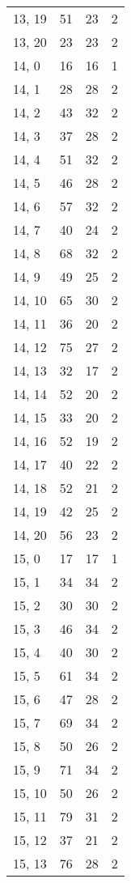 \begin{table}
\begin{tabular}{llll}
13, 19 &   51 &   23 &     2 \\
13, 20 &   23 &   23 &     2 \\
14, 0  &   16 &   16 &     1 \\
14, 1  &   28 &   28 &     2 \\
14, 2  &   43 &   32 &     2 \\
14, 3  &   37 &   28 &     2 \\
14, 4  &   51 &   32 &     2 \\
14, 5  &   46 &   28 &     2 \\
14, 6  &   57 &   32 &     2 \\
14, 7  &   40 &   24 &     2 \\
14, 8  &   68 &   32 &     2 \\
14, 9  &   49 &   25 &     2 \\
14, 10 &   65 &   30 &     2 \\
14, 11 &   36 &   20 &     2 \\
14, 12 &   75 &   27 &     2 \\
14, 13 &   32 &   17 &     2 \\
14, 14 &   52 &   20 &     2 \\
14, 15 &   33 &   20 &     2 \\
14, 16 &   52 &   19 &     2 \\
14, 17 &   40 &   22 &     2 \\
14, 18 &   52 &   21 &     2 \\
14, 19 &   42 &   25 &     2 \\
14, 20 &   56 &   23 &     2 \\
15, 0  &   17 &   17 &     1 \\
15, 1  &   34 &   34 &     2 \\
15, 2  &   30 &   30 &     2 \\
15, 3  &   46 &   34 &     2 \\
15, 4  &   40 &   30 &     2 \\
15, 5  &   61 &   34 &     2 \\
15, 6  &   47 &   28 &     2 \\
15, 7  &   69 &   34 &     2 \\
15, 8  &   50 &   26 &     2 \\
15, 9  &   71 &   34 &     2 \\
15, 10 &   50 &   26 &     2 \\
15, 11 &   79 &   31 &     2 \\
15, 12 &   37 &   21 &     2 \\
15, 13 &   76 &   28 &     2 \\

\end{tabular}
\end{table}
